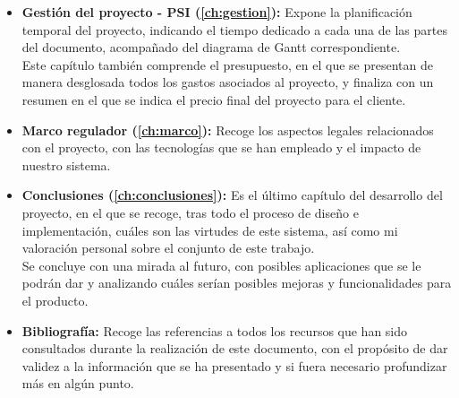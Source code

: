 \begin{itemize}
	\item \textbf{Gestión del proyecto - PSI (\autoref{ch:gestion}):} Expone la planificación temporal del proyecto, indicando el tiempo dedicado a cada una de las partes del documento, acompañado del diagrama de Gantt correspondiente. \\ Este capítulo también comprende el presupuesto, en el que se presentan de manera desglosada todos los gastos asociados al proyecto, y finaliza con un resumen en el que se indica el precio final del proyecto para el cliente.
	\item \textbf{Marco regulador (\autoref{ch:marco}):} Recoge los aspectos legales relacionados con el proyecto, con las tecnologías que se han empleado y el impacto de nuestro sistema.
	\item \textbf{Conclusiones (\autoref{ch:conclusiones}):} Es el último capítulo del desarrollo del proyecto, en el que se recoge, tras todo el proceso de diseño e implementación, cuáles son las virtudes de este sistema, así como mi valoración personal sobre el conjunto de este trabajo. \\ Se concluye con una mirada al futuro, con posibles aplicaciones que se le podrán dar y analizando cuáles serían posibles mejoras y funcionalidades para el producto.
	\item \textbf{Bibliografía:} Recoge las referencias a todos los recursos que han sido consultados durante la realización de este documento, con el propósito de dar validez a la información que se ha presentado y si fuera necesario profundizar más en algún punto.
\end{itemize}